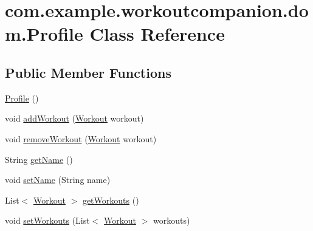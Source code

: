\hypertarget{classcom_1_1example_1_1workoutcompanion_1_1dom_1_1_profile}{\section{com.\-example.\-workoutcompanion.\-dom.\-Profile Class Reference}
\label{classcom_1_1example_1_1workoutcompanion_1_1dom_1_1_profile}
}
\subsection*{Public Member Functions}
\begin{DoxyCompactItemize}
\item 
\hyperlink{classcom_1_1example_1_1workoutcompanion_1_1dom_1_1_profile_a7864d394beb2f58cca1319c57d525048}{Profile} ()
\item 
void \hyperlink{classcom_1_1example_1_1workoutcompanion_1_1dom_1_1_profile_ab7f72d54e1eb8cf4311e025ad4629a01}{add\-Workout} (\hyperlink{classcom_1_1example_1_1workoutcompanion_1_1dom_1_1_workout}{Workout} workout)
\item 
void \hyperlink{classcom_1_1example_1_1workoutcompanion_1_1dom_1_1_profile_a7bc92d322add1308cba46dafd1018195}{remove\-Workout} (\hyperlink{classcom_1_1example_1_1workoutcompanion_1_1dom_1_1_workout}{Workout} workout)
\item 
String \hyperlink{classcom_1_1example_1_1workoutcompanion_1_1dom_1_1_profile_a226ddee02ad02b0dd027f754dede5031}{get\-Name} ()
\item 
void \hyperlink{classcom_1_1example_1_1workoutcompanion_1_1dom_1_1_profile_a127e4507e0f6c9eb08125a1507a01944}{set\-Name} (String name)
\item 
List$<$ \hyperlink{classcom_1_1example_1_1workoutcompanion_1_1dom_1_1_workout}{Workout} $>$ \hyperlink{classcom_1_1example_1_1workoutcompanion_1_1dom_1_1_profile_af184b95d5481b6bc850b602b470a02c1}{get\-Workouts} ()
\item 
void \hyperlink{classcom_1_1example_1_1workoutcompanion_1_1dom_1_1_profile_a33221af697e6082f614da117a87a28a1}{set\-Workouts} (List$<$ \hyperlink{classcom_1_1example_1_1workoutcompanion_1_1dom_1_1_workout}{Workout} $>$ workouts)
\end{DoxyCompactItemize}


